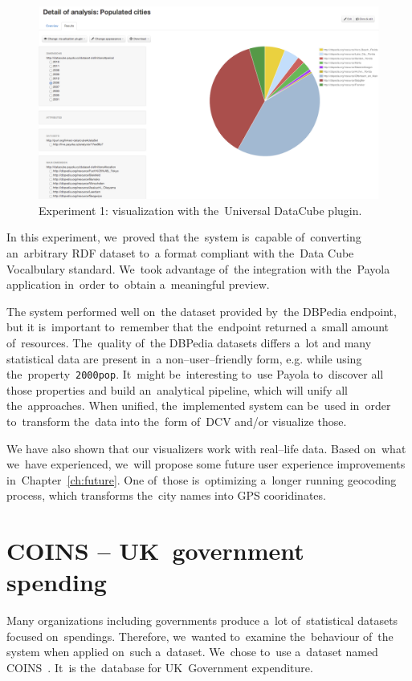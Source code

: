 \begin{figure}
  \centering
  \includegraphics[width=140mm]{img/payola-exp-01-vis2.png}
  \caption{Experiment 1: visualization with the~Universal DataCube plugin.}
  \label{fig:payola-exp-01-vis2}
\end{figure}

In this experiment, we~proved that the~system is~capable of~converting an~arbitrary RDF dataset to~a format compliant with the~Data Cube Vocalbulary 
standard. We~took advantage of~the integration with the~Payola application in~order to~obtain a~meaningful preview.

The system performed well on~the dataset provided by~the DBPedia endpoint, but 
it is~important to~remember that the~endpoint returned a~small amount of~resources. The~quality of~the DBPedia datasets differs a~lot and many 
statistical data are present in~a non--user--friendly form, e.g. while using the~property~\texttt{2000pop}. It~might be~interesting to~use Payola to~discover 
all those properties and build an~analytical pipeline, which will unify all the~approaches. When unified, the~implemented system can be~used in~order to~transform the~data into the~form of~DCV and/or visualize those.

We have also shown that our visualizers work with real--life data. Based on~what we~have experienced, we~will propose some future user experience 
improvements in~Chapter~\ref{ch:future}. One of~those is~optimizing a~longer running 
geocoding process, which transforms the~city names into GPS cooridinates.

\section{COINS -- UK~government spending}
Many organizations including governments produce a~lot of~statistical datasets 
focused on~spendings. Therefore, we~wanted to~examine the~behaviour of~the 
system when applied on~such a~dataset. We~chose to~use a~dataset named 
COINS~\cite{coins}. It~is the~database for UK~Government expenditure.

